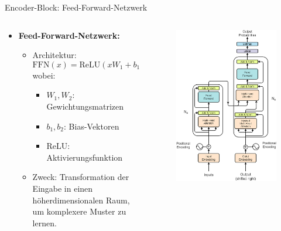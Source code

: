 \documentclass[aspectratio=1610, xcolor=dvipsnames, 9pt]{beamer}
\begin{document}
\begin{frame}{Encoder-Block: Feed-Forward-Netzwerk}
  \begin{columns}
    \begin{column}{0.7\textwidth}
      \begin{itemize}
        \item \textbf{Feed-Forward-Netzwerk:}
          \begin{itemize}
            \item Architektur:
              \[
              \text{FFN}(x) = \text{ReLU}(xW_1 + b_1)W_2 + b_2
              \]
              wobei:
              \begin{itemize}
                \item \( W_1, W_2 \): Gewichtungsmatrizen
                \item \( b_1, b_2 \): Bias-Vektoren
                \item ReLU: Aktivierungsfunktion
              \end{itemize}
            \item Zweck: Transformation der Eingabe in einen höherdimensionalen Raum, um komplexere Muster zu lernen.
          \end{itemize}
      \end{itemize}
    \end{column}
    \begin{column}{0.3\textwidth}
      \begin{figure}
        \centering
        \includegraphics[width=0.9\columnwidth]{images/Transformer-architecture-figure-sourced-from-original-paper-26.png}

\end{figure}
\end{column}
\end{columns}
\end{frame}
\end{document}

